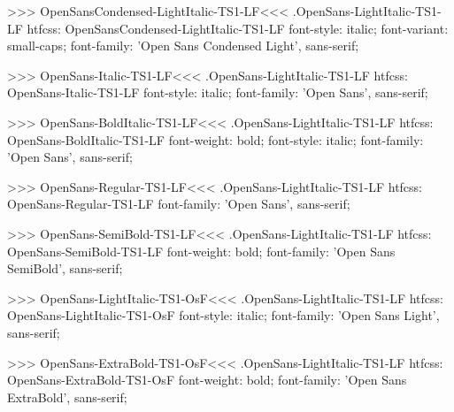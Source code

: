 >>>
\<OpenSansCondensed-LightItalic-TS1-LF\><<<
.OpenSans-LightItalic-TS1-LF
htfcss:  OpenSansCondensed-LightItalic-TS1-LF  font-style: italic; font-variant: small-caps; font-family: 'Open Sans Condensed Light', sans-serif;

>>>
\<OpenSans-Italic-TS1-LF\><<<
.OpenSans-LightItalic-TS1-LF
htfcss:  OpenSans-Italic-TS1-LF  font-style: italic; font-family: 'Open Sans', sans-serif;

>>>
\<OpenSans-BoldItalic-TS1-LF\><<<
.OpenSans-LightItalic-TS1-LF
htfcss:  OpenSans-BoldItalic-TS1-LF  font-weight: bold; font-style: italic; font-family: 'Open Sans', sans-serif;

>>>
\<OpenSans-Regular-TS1-LF\><<<
.OpenSans-LightItalic-TS1-LF
htfcss:  OpenSans-Regular-TS1-LF  font-family: 'Open Sans', sans-serif;

>>>
\<OpenSans-SemiBold-TS1-LF\><<<
.OpenSans-LightItalic-TS1-LF
htfcss:  OpenSans-SemiBold-TS1-LF  font-weight: bold; font-family: 'Open Sans SemiBold', sans-serif;

>>>
\<OpenSans-LightItalic-TS1-OsF\><<<
.OpenSans-LightItalic-TS1-LF
htfcss:  OpenSans-LightItalic-TS1-OsF  font-style: italic; font-family: 'Open Sans Light', sans-serif;

>>>
\<OpenSans-ExtraBold-TS1-OsF\><<<
.OpenSans-LightItalic-TS1-LF
htfcss:  OpenSans-ExtraBold-TS1-OsF  font-weight: bold; font-family: 'Open Sans ExtraBold', sans-serif;

